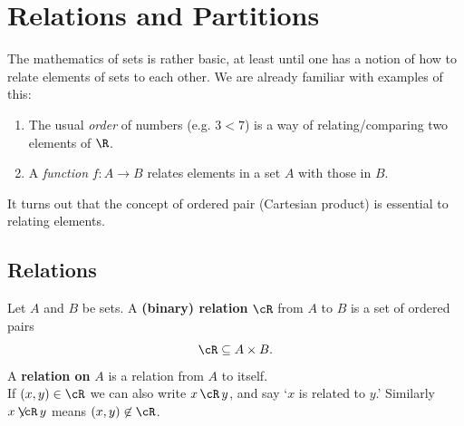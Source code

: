 \graphicspath{{notes/7relations/}}

\section{Relations and Partitions}\label{sec:relations}

The mathematics of sets is rather basic, at least until one has a notion of how to relate elements of sets to each other. We are already familiar with examples of this:
\begin{enumerate}
  \item The usual \emph{order} of numbers (e.g. $3<7$) is a way of relating/comparing two elements of $\R$.%
  \item A \emph{function} $f:A\to B$ relates elements in a set $A$ with those in $B$.
\end{enumerate}
It turns out that the concept of ordered pair (Cartesian product) is essential to relating elements.

\subsection{Relations}

\begin{defn}
Let $A$ and $B$ be sets. A \textbf{(binary) relation} $\cR$ from $A$ to $B$ is a set of ordered pairs
\[\cR\subseteq A\times B.\]
A \textbf{relation on} $A$ is a relation from $A$ to itself.\\
If $(x,y)\in\cR$ we can also write $x\,\cR\,y$, and say `$x$ is related to $y$.' Similarly $x\not\!\!\cR\,y$ means $(x,y)\not\in\cR$.
\end{defn}

